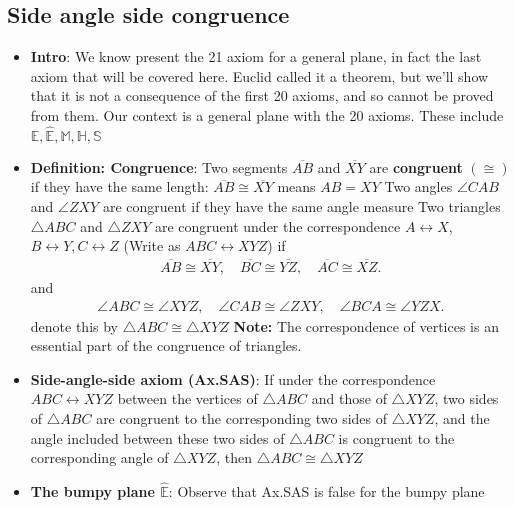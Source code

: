 \documentclass{report}
\begin{document}
    \subsection{Side angle side congruence}
    \begin{itemize}
        \item \textbf{Intro}: We know present the 21 axiom for a general plane, in fact the last axiom that will be covered here. Euclid called it a theorem, but we'll show that it is not a consequence of the first 20 axioms, and so cannot be proved from them.
            \bigbreak \noindent 
            Our context is a general plane with the 20 axioms. These include $\mathbb{E}, \hat{\mathbb{E}}, \mathbb{M}, \mathbb{H}, \mathbb{S} $
        \item \textbf{Definition: Congruence}: Two segments $\overline{AB}$ and $ \overline{XY}$ are \textbf{congruent} $(\cong)$ if they have the same length: $\overline{AB} \cong \overline{XY} $ means $AB = XY$
            \bigbreak \noindent 
            Two angles $\angle CAB$ and $\angle ZXY$ are congruent if they have the same angle measure
            \bigbreak \noindent 
            Two triangles $\triangle ABC$ and $\triangle ZXY$ are congruent under the correspondence $A\leftrightarrow X$, $B \leftrightarrow Y, C\leftrightarrow Z$ (Write as $ABC \leftrightarrow XYZ $) if 
            \begin{align*}
                \overline{AB} \cong \overline{XY},\quad \overline{BC} \cong\overline{YZ} ,\quad \overline{AC} \cong \overline{XZ}
            .\end{align*}
            and 
            \begin{align*}
                \angle ABC \cong \angle XYZ, \quad \angle CAB \cong \angle ZXY,\quad \angle BCA \cong \angle YZX
            .\end{align*}
            denote this by $\triangle ABC \cong \triangle XYZ $
            \bigbreak \noindent 
            \textbf{Note:} The correspondence of vertices is an essential part of the congruence of triangles.
        \item \textbf{Side-angle-side axiom (Ax.SAS)}: If under the correspondence $ABC \leftrightarrow XYZ$ between the vertices of $ \triangle ABC$ and those of $ \triangle XYZ$, two sides of $ \triangle ABC$ are congruent to the corresponding two sides of $\triangle XYZ$, and the angle included between these two sides of $ \triangle ABC$ is congruent to the corresponding angle of $\triangle XYZ$, then $\triangle ABC \cong \triangle XYZ$
        \item \textbf{The bumpy plane $\hat{\mathbb{E}}$}: Observe that Ax.SAS is false for the bumpy plane

\end{itemize}
\end{document}
